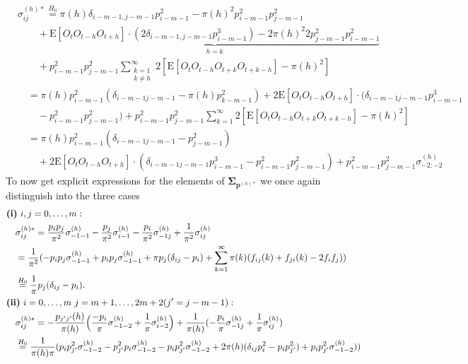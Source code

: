 ﻿\documentclass[12pt,a4paper]{scrreprt}
\theoremstyle{definition}
\begin{document}
\begin{appendices}
{\begin{align*}
    &\sigma_{ij}^{(h)*} \overset{H_0}{=} \pi(h) \delta_{{i-m-1},j-m-1} p_{i-m-1}^2 -  \pi(h)^2 p_{i-m-1}^2 p_{j-m-1}^2\\
    &\qquad + \underbrace{\mathrm{E}[O_t O_{t-h} O_{t+h}]\cdot \left(2\delta_{{i-m-1},j-m-1}p_{i-m-1}^3 \right) - 2\pi(h)^2 2p_{j-m-1}^2p^2_{i-m-1}}_{h=k} \\
    &\qquad +  p_{i-m-1}^2 p_{j-m-1}^2 \sum_{\substack{k=1\\k\neq h}}^{\infty}  2\left[\mathrm{E}[O_t O_{t-h} O_{t+k} O_{t+k-h}]- \pi(h)^2\right] \\
    &\quad = \pi(h) p_{i-m-1}^2 (\delta_{i-m-1j-m-1}- \pi(h)p_{k-m-1}^2)+ 2\mathrm{E}[O_t O_{t-h} O_{t+h}]\cdot(\delta_{i-m-1j-m-1}p_{i-m-1}^3 \\
    &\qquad - p_{i-m-1}^2p_{j-m-1}^2)  +  p_{i-m-1}^2 p_{j-m-1}^2 \sum_{k=1}^{\infty}  2\left[\mathrm{E}[O_t O_{t-h} O_{t+k} O_{t+k-h}]- \pi(h)^2\right] \\
    &\quad = \pi(h) p_{i-m-1}^2 (\delta_{i-m-1j-m-1}- p_{j-m-1}^2)  \\
    &\qquad +2\mathrm{E}[O_t O_{t-h} O_{t+h}]\cdot(\delta_{i-m-1j-m-1}p_{i-m-1}^3- p_{i-m-1}^2p_{j-m-1}^2)+p_{i-m-1}^2 p_{j-m-1}^2\sigma^{(h)}_{-2; -2}  
\end{align*}
}To now get explicit expressions for the elements of $\boldsymbol{\Sigma}_{\boldsymbol{p}^{(h)*}}$ we once again distinguish into the three cases 
\allowdisplaybreaks
\begin{align*}
    &\textbf{(i)}\ i,j = 0, \ldots, m: \\
    &\quad \sigma^{(h)*}_{ij}
    = \frac{p_i p_j}{\pi^2} \sigma^{(h)}_{-1-1} 
    - \frac{p_j}{\pi^2} \sigma^{(h)}_{i-1} 
    - \frac{p_i}{\pi^2} \sigma^{(h)}_{-1j} 
    + \frac{1}{\pi^2} \sigma^{(h)}_{ij} \\
    &\quad = \frac{1}{\pi^2}(-p_i p_j \sigma^{(h)}_{-1-1} + p_i p_j \sigma^{(h)}_{-1-1} + \pi p_{j}(\delta_{ij} - p_i) + \sum_{k=1}^{\infty}\pi(k)(f_{ij}(k) + f_{ji}(k) - 2f_i f_j)) \\
    &\quad \overset{H_0}{=} \frac{1}{\pi} p_j(\delta_{ij} - p_i).\\
    &\textbf{(ii)}\ i = 0, \ldots, m\ j = m+1, \ldots, 2m+2  (j' = j - m-1): \\
    &\quad \sigma^{(h)*}_{ij}
    = -\frac{p_{j'j'}(h)}{\pi(h)}\Bigl(\frac{- p_i}{\pi}\sigma^{(h)}_{-1-2} + \frac{1}{\pi}\sigma_{i-2}^{(h)}\Bigr)+ \frac{1}{\pi(h)}(-\frac{p_{i}}{\pi}\sigma_{-1j}^{(h)}+ \frac{1}{\pi}\sigma_{ij}^{(h)}) \\
    &\quad \overset{H_0}{=} \frac{1}{\pi(h)\pi}( p_i p_{j'}^2 \sigma_{-1-2}^{(h)} - p_{j'}^2 p_i\sigma_{-1-2}^{(h)} - p_i p_{j'}^2\sigma_{-1-2}^{(h)} + 2\pi(h)(\delta_{ij}p_i^2-p_i p_{j'}^2) + p_i p_{j'}^2\sigma_{-1-2}^{(h)}))   \\

\end{align*}
\end{appendices}
\end{document}
